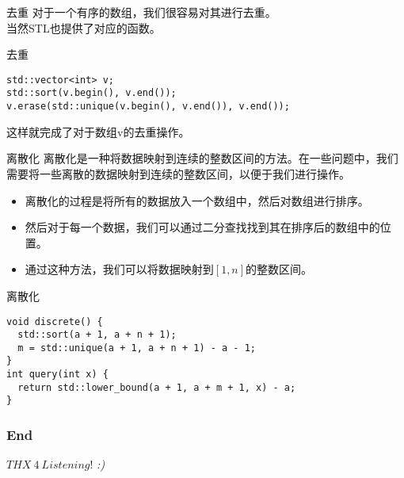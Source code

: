 \documentclass{ldr-simple-gray}
\begin{document}
  \begin{frame}[fragile]{去重}
    对于一个有序的数组，我们很容易对其进行去重。\\当然STL也提供了对应的函数。

    \begin{block}{去重}
      \begin{verbatim}
std::vector<int> v;
std::sort(v.begin(), v.end());
v.erase(std::unique(v.begin(), v.end()), v.end());\end{verbatim}
        这样就完成了对于数组v的去重操作。
    \end{block}
  \end{frame}

  \begin{frame}{离散化}
    离散化是一种将数据映射到连续的整数区间的方法。在一些问题中，我们需要将一些离散的数据映射到连续的整数区间，以便于我们进行操作。
    \begin{itemize}
      \item 离散化的过程是将所有的数据放入一个数组中，然后对数组进行排序。
      \item 然后对于每一个数据，我们可以通过二分查找找到其在排序后的数组中的位置。
      \item 通过这种方法，我们可以将数据映射到$[1,n]$的整数区间。
    \end{itemize}
  \end{frame}

  \begin{frame}[fragile]{离散化}
    \begin{verbatim}
void discrete() {
  std::sort(a + 1, a + n + 1);
  m = std::unique(a + 1, a + n + 1) - a - 1;
}
int query(int x) {
  return std::lower_bound(a + 1, a + m + 1, x) - a;
}
    \end{verbatim}
  \end{frame}

  \begin{frame} %
    \frametitle{End}
    \begin{center}
      \Huge{$THX\ 4\ Listening!$}
      \emph{:)}
    \end{center}
  \end{frame}
\end{document}
